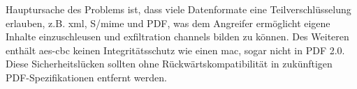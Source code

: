 \par
Hauptursache des Problems ist, dass viele Datenformate eine Teilverschlüsselung erlauben, z.B. \gls{xml}, S/\gls{mime} und PDF, was dem Angreifer ermöglicht eigene Inhalte einzuschleusen und exfiltration channels bilden zu können. Des Weiteren enthält \gls{aes}-\gls{cbc} keinen Integritätsschutz wie einen \gls{mac}, sogar nicht in PDF 2.0. Diese Sicherheitslücken sollten ohne Rückwärtskompatibilität in zukünftigen PDF-Spezifikationen entfernt werden. \cite{pdfex}
